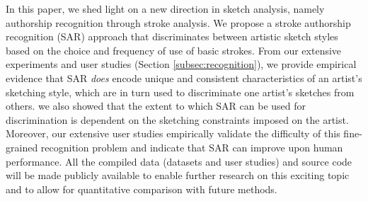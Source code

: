 In this paper, we shed light on a new direction in sketch analysis, namely authorship recognition through stroke analysis. We propose a stroke authorship recognition (SAR) approach that discriminates between artistic sketch styles based on the choice and frequency of use of basic strokes. From our extensive experiments and user studies (Section \ref{subsec:recognition}), we provide empirical evidence that SAR \emph{does} encode unique and consistent characteristics of an artist's sketching style, which are in turn used to discriminate one artist's sketches from others. we also showed that the extent to which SAR can be used for discrimination is dependent on the sketching constraints imposed on the artist. Moreover, our extensive user studies empirically validate the difficulty of this fine-grained recognition problem and indicate that SAR can improve upon human performance. All the compiled data (datasets and user studies) and source code will be made publicly available to enable further research on this exciting topic and to allow for quantitative comparison with future methods.








